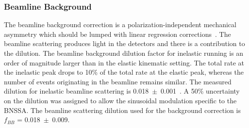 \subsubsection{Beamline Background}
\label{Beamline Background}

The beamline background correction is a polarization-independent mechanical asymmetry which should be lumped with linear regression corrections~\cite{mack_QweakBackgroundCorrections}. The beamline scattering produces light in the detectors and there is a contribution to the dilution. 
The beamline background dilution factor for inelastic running is an order of magnitude larger than in the elastic kinematic setting. The total rate at the inelastic peak drops to 10\% of the total rate at the elastic peak, whereas the number of events originating in the beamline remains similar. The measured dilution for inelastic beamline scattering is 0.018~$\pm$~0.001~\cite{leacock_qweak, elog:mack_analysis784}. A 50\% uncertainty on the dilution was assigned to allow the sinusoidal modulation specific to the BNSSA. The beamline scattering dilution used for the background correction is $f_{BB}$ = 0.018~$\pm$~0.009. 

